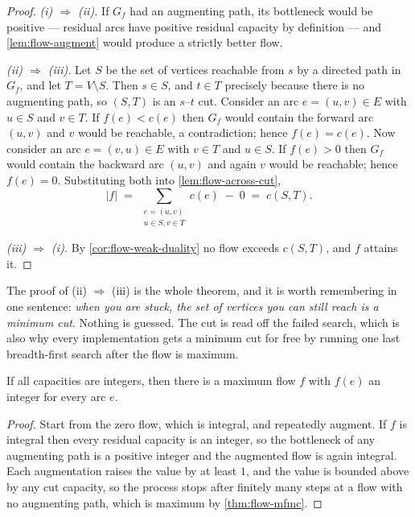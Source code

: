 \begin{proof}
\emph{(i) $\Rightarrow$ (ii).} If $G_f$ had an augmenting path, its bottleneck
would be positive --- residual arcs have positive residual capacity by
definition --- and \cref{lem:flow-augment} would produce a strictly better
flow.

\emph{(ii) $\Rightarrow$ (iii).} Let $S$ be the set of vertices reachable from
$s$ by a directed path in $G_f$, and let $T = V \setminus S$. Then $s \in S$,
and $t \in T$ precisely because there is no augmenting path, so $(S,T)$ is an
$s$--$t$ cut. Consider an arc $e = (u,v) \in E$ with $u \in S$ and $v \in T$.
If $f(e) < c(e)$ then $G_f$ would contain the forward arc $(u,v)$ and $v$ would
be reachable, a contradiction; hence $f(e) = c(e)$. Now consider an arc
$e = (v,u) \in E$ with $v \in T$ and $u \in S$. If $f(e) > 0$ then $G_f$ would
contain the backward arc $(u,v)$ and again $v$ would be reachable; hence
$f(e) = 0$. Substituting both into \cref{lem:flow-across-cut},
\[ |f| \;=\; \sum_{\substack{e=(u,v)\\ u\in S, v\in T}} c(e) \;-\; 0
       \;=\; c(S,T). \]

\emph{(iii) $\Rightarrow$ (i).} By \cref{cor:flow-weak-duality} no flow exceeds
$c(S,T)$, and $f$ attains it.
\end{proof}

\begin{intuition}
The proof of (ii) $\Rightarrow$ (iii) is the whole theorem, and it is worth
remembering in one sentence: \emph{when you are stuck, the set of vertices you
can still reach is a minimum cut}. Nothing is guessed. The cut is read off the
failed search, which is also why every implementation gets a minimum cut for
free by running one last breadth-first search after the flow is maximum.
\end{intuition}

\begin{corollary}[Integrality]\label{cor:flow-integrality}
If all capacities are integers, then there is a maximum flow $f$ with $f(e)$ an
integer for every arc $e$.
\end{corollary}

\begin{proof}
Start from the zero flow, which is integral, and repeatedly augment. If $f$ is
integral then every residual capacity is an integer, so the bottleneck of any
augmenting path is a positive integer and the augmented flow is again integral.
Each augmentation raises the value by at least $1$, and the value is bounded
above by any cut capacity, so the process stops after finitely many steps at a
flow with no augmenting path, which is maximum by \cref{thm:flow-mfmc}.
\end{proof}

